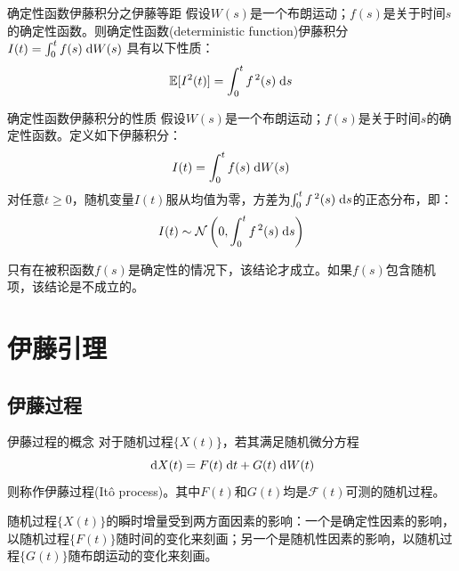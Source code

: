 \documentclass[t]{beamer}
\newcommand{\dif}{{\;\rm d}}
\newcommand{\E}{\mathbb{E}}
\begin{document}
\begin{frame}{确定性函数伊藤积分之伊藤等距}
假设$W(s)$是一个布朗运动；$f(s)$是关于时间$s$的{\color{red}确定性函数}。则确定性函数(deterministic function)伊藤积分$I(t)=\int^t_0 f(s)\dif W(s)$
具有以下性质：
\[	\E [I^2(t)]=\int^t_0 f^{\,2}(s)\dif s\]
\end{frame}

\begin{frame}{确定性函数伊藤积分的性质}
假设$W(s)$是一个布朗运动；$f(s)$是关于时间$s$的{\color{red}确定性函数}。定义如下伊藤积分：
\begin{equation*}
I(t)=\int^t_0 f(s)\dif W(s)
\end{equation*}
对任意$t\ge 0$，随机变量$I(t)$服从均值为零，方差为$\int^t_0 f^{\,2}(s)\dif s$的正态分布，即：
\begin{equation*}
I(t)\sim \mathcal{N}\left(0, \int^t_0 f^{\,2}(s)\dif s\right)
\end{equation*}

\begin{block}{}
\color{blue}只有在被积函数$f(s)$是确定性的情况下，该结论才成立。如果$f(s)$包含随机项，该结论是不成立的。
\end{block}
\end{frame}


\section{伊藤引理}

\subsection{伊藤过程}

\begin{frame}{伊藤过程的概念}
对于随机过程$\{X(t)\}$，若其满足随机微分方程
\begin{equation*}
\dif X(t)=F(t)\dif t+G(t)\dif W(t)
\end{equation*}
则称作伊藤过程(It\^{o} process)。其中$F(t)$和$G(t)$均是$\mathcal{F}(t)$可测的随机过程。

\begin{block}{}
随机过程$\{X(t)\}$的瞬时增量受到两方面因素的影响：一个是确定性因素的影响，以随机过程$\{F(t)\}$随时间的变化来刻画；另一个是随机性因素的影响，以随机过程$\{G(t)\}$随布朗运动的变化来刻画。
\end{block}
\end{frame}
\end{document}
